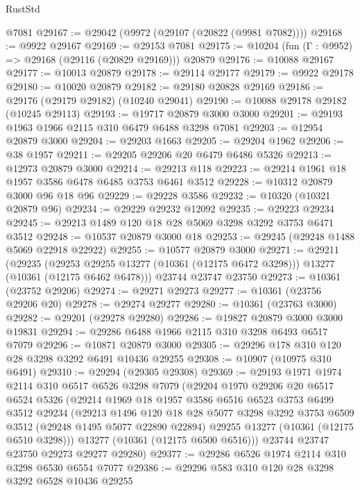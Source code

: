 \begin{lexlean}{RustStd}
\begin{coremodule}
    @7081
@29167 := @29042 (@9972 (@29107 (@20822 (@9981 @7082))))
@29168 := @9922 @29167
@29169 := @29153 @7081
@29175 := @10204 (fun (Γ : @9952) => @29168 (@29116 (@20829 @29169))) @20879
@29176 := @10088 @29167
@29177 := @10013 @20879
@29178 := @29114 @29177
@29179 := @9922 @29178
@29180 := @10020 @20879
@29182 := @29180 @20828 @29169
@29186 := @29176 (@29179 @29182) (@10240 @29041)
@29190 := @10088 @29178 @29182 (@10245 @29113)
@29193 := @19717 @20879 @3000 @3000
@29201 := @29193 @1963 @1966 @2115 @310 @6479 @6488 @3298 @7081
@29203 := @12954 @20879 @3000
@29204 := @29203 @1663
@29205 := @29204 @1962
@29206 := @38 @1957
@29211 := @29205 @29206 @20 @6479 @6486 @5326
@29213 := @12973 @20879 @3000
@29214 := @29213 @118
@29223 := @29214 @1961 @18 @1957 @3586 @6478 @6485 @3753 @6461 @3512
@29228 := @10312 @20879 @3000 @96 @18 @96
@29229 := @29228 @3586
@29232 := @10320 (@10321 @20879 @96)
@29234 := @29229 @29232 @12092
@29235 := @29223 @29234
@29245 := @29213 @1489 @120 @18 @28 @5069 @3298 @3292 @3753 @6471 @3512
@29248 := @10537 @20879 @3000 @18
@29253 := @29245 (@29248 @1488 @5069 @22918 @22922)
@29255 := @10577 @20879 @3000
@29271 := @29211
    (@29235
      (@29253 @29255 @13277 (@10361 (@12175 @6472 @3298)))
      @13277
      (@10361 (@12175 @6462 @6478)))
    @23744
    @23747
    @23750
@29273 := @10361 (@23752 @29206)
@29274 := @29271 @29273
@29277 := @10361 (@23756 @29206 @20)
@29278 := @29274 @29277
@29280 := @10361 (@23763 @3000)
@29282 := @29201 (@29278 @29280)
@29286 := @19827 @20879 @3000 @3000 @19831
@29294 := @29286 @6488 @1966 @2115 @310 @3298 @6493 @6517 @7079
@29296 := @10871 @20879 @3000
@29305 := @29296 @178 @310 @120 @28 @3298 @3292 @6491 @10436 @29255
@29308 := @10907 (@10975 @310 @6491)
@29310 := @29294 (@29305 @29308)
@29369 := @29193
    @1971
    @1974
    @2114
    @310
    @6517
    @6526
    @3298
    @7079
    (@29204
      @1970
      @29206
      @20
      @6517
      @6524
      @5326
      (@29214
        @1969
        @18
        @1957
        @3586
        @6516
        @6523
        @3753
        @6499
        @3512
        @29234
        (@29213
          @1496
          @120
          @18
          @28
          @5077
          @3298
          @3292
          @3753
          @6509
          @3512
          (@29248 @1495 @5077 @22890 @22894)
          @29255
          @13277
          (@10361 (@12175 @6510 @3298)))
        @13277
        (@10361 (@12175 @6500 @6516)))
      @23744
      @23747
      @23750
      @29273
      @29277
      @29280)
@29377 := @29286 @6526 @1974 @2114 @310 @3298 @6530 @6554 @7077
@29386 := @29296 @583 @310 @120 @28 @3298 @3292 @6528 @10436 @29255

\end{coremodule}
\end{lexlean}
